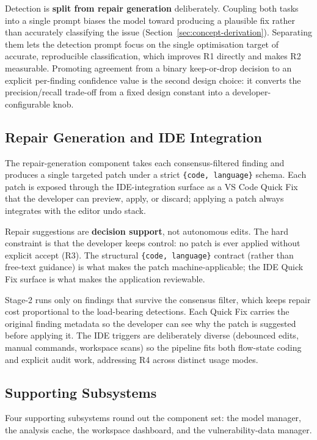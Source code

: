 Detection is \textbf{split from repair generation} deliberately. Coupling both tasks into a single prompt biases the model toward producing a plausible fix rather than accurately classifying the issue (Section~\ref{sec:concept-derivation}). Separating them lets the detection prompt focus on the single optimisation target of accurate, reproducible classification, which improves R1 directly and makes R2 measurable. Promoting agreement from a binary keep-or-drop decision to an explicit per-finding confidence value is the second design choice: it converts the precision/recall trade-off from a fixed design constant into a developer-configurable knob.

\subsection{Repair Generation and IDE Integration}
\label{subsec:repair-ide}

The repair-generation component takes each consensus-filtered finding and produces a single targeted patch under a strict \texttt{\{code, language\}} schema. Each patch is exposed through the IDE-integration surface as a VS Code Quick Fix that the developer can preview, apply, or discard; applying a patch always integrates with the editor undo stack.

Repair suggestions are \textbf{decision support}, not autonomous edits. The hard constraint is that the developer keeps control: no patch is ever applied without explicit accept (R3). The structural \texttt{\{code, language\}} contract (rather than free-text guidance) is what makes the patch machine-applicable; the IDE Quick Fix surface is what makes the application reviewable.

Stage-2 runs only on findings that survive the consensus filter, which keeps repair cost proportional to the load-bearing detections. Each Quick Fix carries the original finding metadata so the developer can see why the patch is suggested before applying it. The IDE triggers are deliberately diverse (debounced edits, manual commands, workspace scans) so the pipeline fits both flow-state coding and explicit audit work, addressing R4 across distinct usage modes.

\subsection{Supporting Subsystems}
\label{subsec:supporting-subsystems}

Four supporting subsystems round out the component set: the model manager, the analysis cache, the workspace dashboard, and the vulnerability-data manager.

